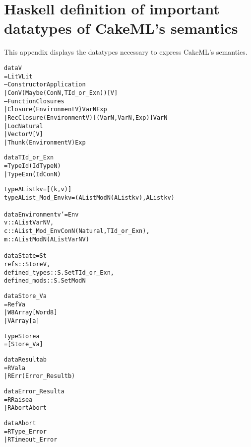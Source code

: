 \chapter{Haskell definition of important datatypes of CakeML's semantics}
\label{app:semprim}

This appendix displays the datatypes necessary to express CakeML's semantics.


\begin{alltt}
data V
  = LitV Lit
  -- Constructor Application
  | ConV (Maybe (ConN, TId_or_Exn)) [V]
  -- Function Closures
  | Closure (Environment V) VarN Exp
  | RecClosure (Environment V) [(VarN, VarN, Exp)] VarN
  | Loc Natural
  | VectorV [V]
  | Thunk (Environment V) Exp

data TId_or_Exn
  = TypeId (Id TypeN)
  | TypeExn (Id ConN)

type AList k v = [(k, v)]
type AList_Mod_Env k v = (AList ModN (AList k v), AList k v)

data Environment v' = Env {
  v :: AList VarN V,
  c :: AList_Mod_Env ConN (Natural, TId_or_Exn),
  m :: AList ModN (AList VarN V)
}

data State = St {
  refs          :: Store V,
  defined_types :: S.Set TId_or_Exn,
  defined_mods  :: S.Set ModN
}

data Store_V a
  = RefV a
  | W8Array [Word8]
  | VArray [a]

type Store a
  = [Store_V a]

data Result a b
  = RVal a
  | RErr (Error_Result b)

data Error_Result a
  = RRaise a
  | RAbort Abort

data Abort
  = RType_Error
  | RTimeout_Error
\end{alltt}
